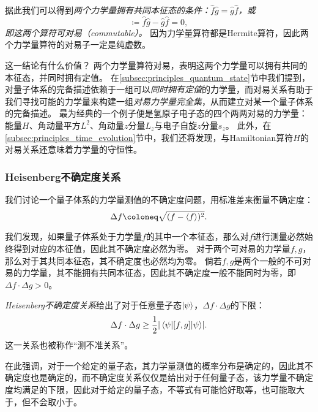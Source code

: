 据此我们可以得到\emph{两个力学量拥有共同本征态的条件：}$\hat{f}\hat{g}=\hat{g}\hat{f}$\emph{，或}
\begin{equation}
    [f,g] \coloneq \hat{f}\hat{g}-\hat{g}\hat{f} = 0,
\end{equation}
\emph{即这两个算符可对易（commutable）。}
因为力学量算符都是Hermite算符，因此两个力学量算符的对易子一定是纯虚数。

这一结论有什么价值？
两个力学量算符对易，表明这两个力学量可以拥有共同的本征态，并同时拥有定值。
在\ref{subsec:principles_quantum_state}节中我们提到，对量子体系的完备描述依赖于一组可以\emph{同时拥有定值}的力学量，而对易关系有助于我们寻找可能的力学量来构建一组\emph{对易力学量完全集}，从而建立对某一个量子体系的完备描述。
最为经典的一个例子便是氢原子电子态的四个两两对易的力学量：能量$H$、角动量平方$L^2$、角动量$z$分量$L_z$与电子自旋$z$分量$s_z$。
此外，在\ref{subsec:principles_time_evolution}节中，我们还将发现，与Hamiltonian算符$H$的对易关系还意味着力学量的守恒性。

\subsubsection{Heisenberg不确定度关系}

我们讨论一个量子体系的力学量测值的不确定度问题，用标准差来衡量不确定度：
\begin{equation}
    \Delta f \coloneq \sqrt{(f-\expval{f})^2}.
\end{equation}

我们发现，如果量子体系处于力学量$f$的其中一个本征态，那么对$f$进行测量必然始终得到对应的本征值，因此其不确定度必然为零。
对于两个可对易的力学量$f,g$，那么对于其共同本征态，其不确定度也必然均为零。
倘若$f,g$是两个一般的不可对易的力学量，其不能拥有共同本征态，因此其不确定度一般不能同时为零，即$\Delta f \cdot \Delta g > 0$。

\emph{Heisenberg不确定度关系}给出了对于任意量子态$\ket{\psi}$，$\Delta f \cdot \Delta g$的下限：
\begin{equation}
    \label{eq:principle_uncertainty_relation}
    \Delta f \cdot \Delta g \geq \frac12 \abs{\mel{\psi}{[f,g]}{\psi}}.
\end{equation}
这一关系也被称作“测不准关系”。

在此强调，对于一个给定的量子态，其力学量测值的概率分布是确定的，因此其不确定度也是确定的，而不确定度关系仅仅是给出对于任何量子态，该力学量不确定度均满足的下限，因此对于给定的量子态，不等式有可能恰好取等，也可能取大于，但不会取小于。

